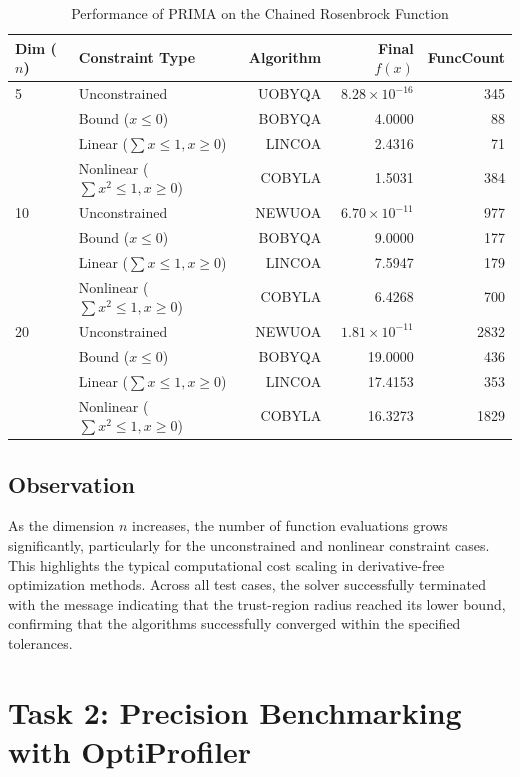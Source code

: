 \documentclass[11pt,a4paper]{article}
\begin{document}
\begin{table}[H]
\centering
\caption{Performance of PRIMA on the Chained Rosenbrock Function}
\label{tab:rosenbrock}
\begin{tabular}{@{}llrrr@{}}
\toprule
\textbf{Dim ($n$)} & \textbf{Constraint Type} & \textbf{Algorithm} & \textbf{Final $f(x)$} & \textbf{FuncCount} \\ \midrule
5 & Unconstrained & UOBYQA & $8.28 \times 10^{-16}$ & 345 \\
  & Bound ($x \le 0$) & BOBYQA & 4.0000 & 88 \\
  & Linear ($\sum x \le 1, x \ge 0$) & LINCOA & 2.4316 & 71 \\
  & Nonlinear ($\sum x^2 \le 1, x \ge 0$) & COBYLA & 1.5031 & 384 \\ \midrule
10 & Unconstrained & NEWUOA & $6.70 \times 10^{-11}$ & 977 \\
   & Bound ($x \le 0$) & BOBYQA & 9.0000 & 177 \\
   & Linear ($\sum x \le 1, x \ge 0$) & LINCOA & 7.5947 & 179 \\
   & Nonlinear ($\sum x^2 \le 1, x \ge 0$) & COBYLA & 6.4268 & 700 \\ \midrule
20 & Unconstrained & NEWUOA & $1.81 \times 10^{-11}$ & 2832 \\
   & Bound ($x \le 0$) & BOBYQA & 19.0000 & 436 \\
   & Linear ($\sum x \le 1, x \ge 0$) & LINCOA & 17.4153 & 353 \\
   & Nonlinear ($\sum x^2 \le 1, x \ge 0$) & COBYLA & 16.3273 & 1829 \\ \bottomrule
\end{tabular}
\end{table}

\subsection{Observation}
As the dimension $n$ increases, the number of function evaluations grows significantly, particularly for the unconstrained and nonlinear constraint cases. This highlights the typical computational cost scaling in derivative-free optimization methods. Across all test cases, the solver successfully terminated with the message indicating that the trust-region radius reached its lower bound, confirming that the algorithms successfully converged within the specified tolerances.

\section{Task 2: Precision Benchmarking with OptiProfiler }
\end{document}
